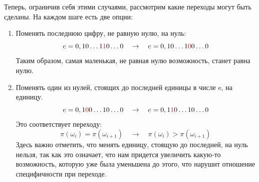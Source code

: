 \documentclass[a4paper, 14pt]{extarticle}
\begin{document}
Теперь, ограничив себя этими случаями, рассмотрим какие переходы могут быть сделаны. На каждом шаге есть две опции:
\begin{enumerate}
    \item Поменять последнюю цифру, не равную нулю, на нуль:
    $$e=0,10\ldots1{\color{red}1}0\ldots0\quad\rightarrow\quad e=0,10\ldots1{\color{red}0}0\ldots0$$ Таким образом, самая маленькая, не равная нулю возможность, станет равна нулю.
    \begin{figure}[h!]
    \end{figure}    
    \item Поменять один из нулей, стоящих до последней единицы в числе e, на единицу.
    $$e=0,1{\color{red}0}0\ldots10\ldots0\quad\rightarrow\quad e=0,1{\color{red}1}0\ldots10\ldots0$$
    Это соответствует переходу: $$\pi(\omega_i)=\pi(\omega_{i+1})\quad\rightarrow\quad\pi(\omega_i)>\pi(\omega_{i+1})$$ Здесь важно отметить, что менять единицу, стоящую до последней, на нуль нельзя, так как это означает, что нам придется увеличить какую-то возможность, которую уже была уменьшена до этого, что нарушит отношение специфичности при переходе.
    \begin{figure}[h!]
    \end{figure}   
\end{enumerate}
\end{document}
